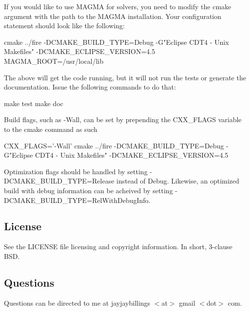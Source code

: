 If you would like to use M\+A\+G\+MA for solvers, you need to modify the cmake argument with the path to the M\+A\+G\+MA installation. Your configuration statement should look like the following\+:


\begin{DoxyCode}
cmake ../fire -DCMAKE\_BUILD\_TYPE=Debug -G"Eclipse CDT4 - Unix Makefiles" -DCMAKE\_ECLIPSE\_VERSION=4.5
       MAGMA\_ROOT=/usr/local/lib
\end{DoxyCode}


The above will get the code running, but it will not run the tests or generate the documentation. Issue the following commands to do that\+: 
\begin{DoxyCode}
make test
make doc
\end{DoxyCode}


Build flags, such as -\/\+Wall, can be set by prepending the C\+X\+X\+\_\+\+F\+L\+A\+GS variable to the cmake command as such


\begin{DoxyCode}
CXX\_FLAGS='-Wall' cmake ../fire -DCMAKE\_BUILD\_TYPE=Debug -G"Eclipse CDT4 - Unix Makefiles"
       -DCMAKE\_ECLIPSE\_VERSION=4.5
\end{DoxyCode}


Optimization flags should be handled by setting -\/\+D\+C\+M\+A\+K\+E\+\_\+\+B\+U\+I\+L\+D\+\_\+\+T\+Y\+PE=Release instead of Debug. Likewise, an optimized build with debug information can be acheived by setting -\/\+D\+C\+M\+A\+K\+E\+\_\+\+B\+U\+I\+L\+D\+\_\+\+T\+Y\+PE=Rel\+With\+Debug\+Info.

\subsection*{License}

See the L\+I\+C\+E\+N\+SE file licensing and copyright information. In short, 3-\/clause B\+SD.

\subsection*{Questions}

Questions can be directed to me at jayjaybillings $<$at$>$ gmail $<$dot$>$ com. 